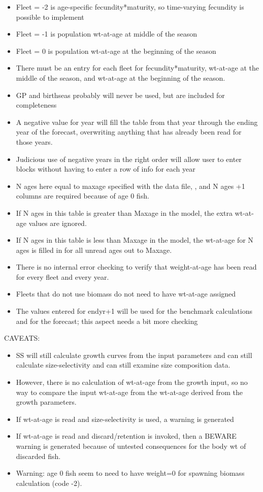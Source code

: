 \begin{itemize}
	\item Fleet = -2 is age-specific fecundity*maturity, so time-varying fecundity is possible to implement
	\item Fleet = -1 is population wt-at-age at middle of the season
	\item Fleet = 0 is population wt-at-age at the beginning of the season
	\item There must be an entry for each fleet for fecundity*maturity, wt-at-age at the middle of the season, and wt-at-age at the beginning of the season.
	\item GP and birthseas probably will never be used, but are included for completeness
	\item A negative value for year will fill the table from that year through the ending year of the forecast, overwriting anything that has already been read for those years.
	\item Judicious use of negative years in the right order will allow user to enter blocks without having to enter a row of info for each year
	\item N ages here equal to maxage specified with the data file, , and N ages +1 columns are required because of age 0 fish.
	\item If N ages in this table is greater than Maxage in the model, the extra wt-at-age values are ignored.
	\item If N ages in this table is less than Maxage in the model, the wt-at-age for N ages is filled in for all unread ages out to Maxage.
	\item There is no internal error checking to  verify that weight-at-age has been read for every fleet and every year. 
	\item Fleets that do not use biomass do not need to have wt-at-age assigned	
	\item The values entered for endyr+1 will be used for the benchmark calculations and for the forecast; this aspect needs a bit more checking
\end{itemize}

CAVEATS:
\begin{itemize}
	\item SS will still calculate growth curves from the input parameters and can still calculate size-selectivity and can still examine size composition data.
	\item However, there is no calculation of wt-at-age from the growth input, so no way to compare the input wt-at-age from the wt-at-age derived from the growth parameters.
	\item If wt-at-age is read and size-selectivity is used, a warning is generated
	\item If wt-at-age is read and discard/retention is invoked, then a BEWARE warning is generated because of untested consequences for the body wt of discarded fish.
	\item Warning:  age 0 fish seem to need to have weight=0 for spawning biomass calculation (code -2).
\end{itemize}

